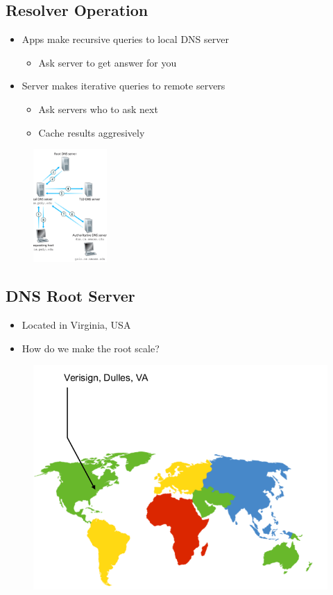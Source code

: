 \subsection{Resolver Operation}
\begin{itemize}[nosep]
    \item Apps make recursive queries to local DNS server
          \begin{itemize}[nosep]
              \item Ask server to get answer for you
          \end{itemize}
    \item Server makes iterative queries to remote servers
          \begin{itemize}[nosep]
              \item Ask servers who to ask next
              \item Cache results aggresively
          \end{itemize}
\end{itemize}
\begin{figure}[H]
    \includegraphics[width=0.25\textwidth]{lazy/resolveroperation.png}
\end{figure}
\subsection{DNS Root Server}
\begin{itemize}[nosep]
    \item Located in Virginia, USA
    \item How do we make the root scale?
\end{itemize}
\begin{figure}[H]
    \includegraphics[scale=0.25]{lazy/dnsrootserver.png}
\end{figure}
